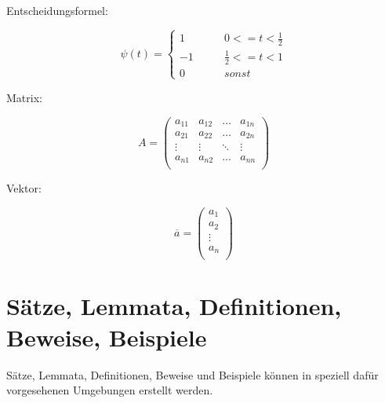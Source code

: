 Entscheidungsformel:

\begin{equation}
	\psi(t)=\left\{\begin{array}{ccc}
		1 & \qquad 0 <= t < \frac{1}{2} \\
		-1 & \qquad \frac{1}{2} <= t <1 \\
		0 & \qquad sonst
	\end{array} \right.
\end{equation}

Matrix:

\begin{equation}
A = \left(
	\begin{array}{llll}
		a_{11} & a_{12} & \ldots & a_{1n} \\
		a_{21} & a_{22} & \ldots & a_{2n} \\
		\vdots & \vdots & \ddots & \vdots \\
		a_{n1} & a_{n2} & \ldots & a_{nn} \\
	\end{array}
\right)
\end{equation}

Vektor:

\begin{equation}
	\overline{a} = \left(
		\begin{array}{c}
			a_{1}\\
			a_{2}\\
			\vdots\\
			a_{n}\\
		\end{array}
	\right)
\end{equation}

\section{Sätze, Lemmata, Definitionen, Beweise, Beispiele}

Sätze, Lemmata, Definitionen, Beweise und Beispiele können in speziell dafür vorgesehenen Umgebungen erstellt werden.

